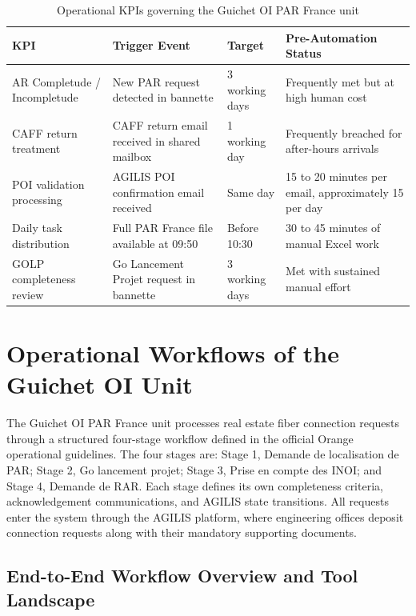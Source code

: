\begin{table}[H]
  \centering
  \caption{Operational KPIs governing the Guichet OI PAR France unit}
  \renewcommand{\arraystretch}{1.0}
  \footnotesize
  \begin{tabularx}{\textwidth}{|X|X|X|X|}
    \hline
    \textbf{KPI} & \textbf{Trigger Event} & \textbf{Target} & \textbf{Pre-Automation Status} \\ \hline
    AR Completude / Incompletude & New PAR request detected in bannette & 3 working days & Frequently met but at high human cost \\ \hline
    CAFF return treatment & CAFF return email received in shared mailbox & 1 working day & Frequently breached for after-hours arrivals \\ \hline
    POI validation processing & AGILIS POI confirmation email received & Same day & 15 to 20 minutes per email, approximately 15 per day \\ \hline
    Daily task distribution & Full PAR France file available at 09:50 & Before 10:30 & 30 to 45 minutes of manual Excel work \\ \hline
    GOLP completeness review & Go Lancement Projet request in bannette & 3 working days & Met with sustained manual effort \\ \hline
  \end{tabularx}
\end{table}

\section{Operational Workflows of the Guichet OI Unit}

The Guichet OI PAR France unit processes real estate fiber connection requests through a structured four-stage workflow defined in the official Orange operational guidelines. The four stages are: Stage 1, Demande de localisation de PAR; Stage 2, Go lancement projet; Stage 3, Prise en compte des INOI; and Stage 4, Demande de RAR. Each stage defines its own completeness criteria, acknowledgement communications, and AGILIS state transitions. All requests enter the system through the AGILIS platform, where engineering offices deposit connection requests along with their mandatory supporting documents.

\subsection{End-to-End Workflow Overview and Tool Landscape}

